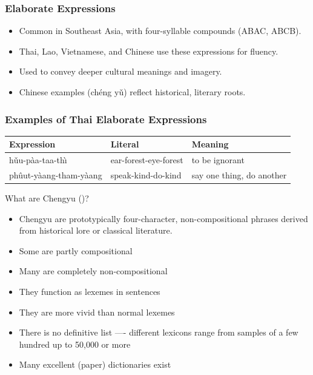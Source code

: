\documentclass[xetex]{beamer}
\begin{document}
\begin{frame}
\frametitle{Elaborate Expressions}
\begin{itemize}
    \item Common in Southeast Asia, with four-syllable compounds (ABAC, ABCB).
    \item Thai, Lao, Vietnamese, and Chinese use these expressions for fluency.
    \item Used to convey deeper cultural meanings and imagery.
    \item Chinese examples (chéng yǔ) reflect historical, literary roots.
\end{itemize}
\end{frame}

\begin{frame}
\frametitle{Examples of Thai Elaborate Expressions}
\begin{table}[]
\centering
\begin{tabular}{lll}
    \textbf{Expression} & \textbf{Literal} & \textbf{Meaning} \\
    \hline
    hǔu-pàa-taa-thı̀ & ear-forest-eye-forest & to be ignorant \\
    phûut-yàang-tham-yàang & speak-kind-do-kind & say one thing, do another \\
\end{tabular}
\end{table}
\end{frame}

\begin{frame}{What are Chengyu ()?}
  \begin{itemize}
  \item Chengyu are prototypically four-character, non-compositional
    phrases derived from historical lore or classical literature.
  \item Some are partly compositional
  \item Many are completely non-compositional
  \item They function as lexemes in sentences
  \item They are  more vivid than normal lexemes
  \item There is no definitive list ---- different lexicons range
    from samples of a few hundred up to 50,000 or more
  \item Many excellent (paper) dictionaries exist
  \end{itemize}
\end{frame}     
\end{document}
